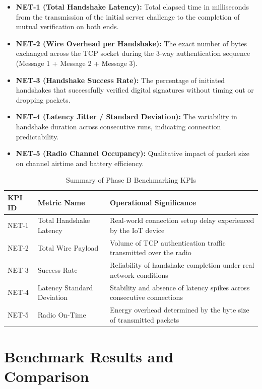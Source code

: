 \documentclass[11pt,a4paper]{article}
\begin{document}
\begin{itemize}
    \item \textbf{NET-1 (Total Handshake Latency):} Total elapsed time in milliseconds from the transmission of the initial server challenge to the completion of mutual verification on both ends.
    \item \textbf{NET-2 (Wire Overhead per Handshake):} The exact number of bytes exchanged across the TCP socket during the 3-way authentication sequence (Message 1 + Message 2 + Message 3).
    \item \textbf{NET-3 (Handshake Success Rate):} The percentage of initiated handshakes that successfully verified digital signatures without timing out or dropping packets.
    \item \textbf{NET-4 (Latency Jitter / Standard Deviation):} The variability in handshake duration across consecutive runs, indicating connection predictability.
    \item \textbf{NET-5 (Radio Channel Occupancy):} Qualitative impact of packet size on channel airtime and battery efficiency.
\end{itemize}

\begin{table}[htbp]
\centering
\small
\caption{Summary of Phase B Benchmarking KPIs}
\label{tab:phase_b_kpis}
\begin{tabularx}{\textwidth}{ll X}
\toprule
\textbf{KPI ID} & \textbf{Metric Name} & \textbf{Operational Significance} \\
\midrule
NET-1 & Total Handshake Latency & Real-world connection setup delay experienced by the IoT device \\
NET-2 & Total Wire Payload & Volume of TCP authentication traffic transmitted over the radio \\
NET-3 & Success Rate & Reliability of handshake completion under real network conditions \\
NET-4 & Latency Standard Deviation & Stability and absence of latency spikes across consecutive connections \\
NET-5 & Radio On-Time & Energy overhead determined by the byte size of transmitted packets \\
\bottomrule
\end{tabularx}
\end{table}

\section{Benchmark Results and Comparison}
\end{document}
